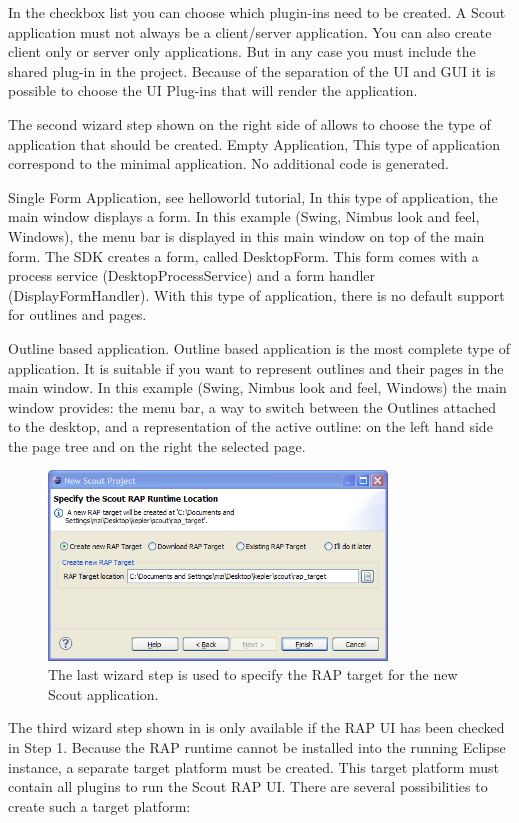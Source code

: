 \documentclass[a4paper,10pt,twoside]{book}
\begin{document}
In the checkbox list you can choose which plugin-ins need to be created. A Scout application must not always be a client/server application.
You can also create client only or server only applications. But in any case you must include the shared plug-in in the project.
Because of the separation of the UI and GUI it is possible to choose the UI Plug-ins that will render the application. 

The second wizard step shown on the right side of  allows to choose the type of application that should be created. 
Empty Application, This type of application correspond to the minimal application. No additional code is generated. 

Single Form Application, see helloworld tutorial, In this type of application, the main window displays a form. In this example (Swing, Nimbus look and feel, Windows), the menu bar is displayed in this main window on top of the main form.
The SDK creates a form, called DesktopForm. This form comes with a process service (DesktopProcessService) and a form handler (DisplayFormHandler).
With this type of application, there is no default support for outlines and pages. 

Outline based application. Outline based application is the most complete type of application. It is suitable if you want to represent outlines and their pages in the main window. 
In this example (Swing, Nimbus look and feel, Windows) the main window provides: the menu bar, a way to switch between the Outlines attached to the desktop, and a representation of the active outline: on the left hand side the page tree and on the right the selected page. 

\begin{figure}
\includegraphics[width=9cm]{wizard_new_project_3.png}
\caption{The last wizard step is used to specify the RAP target for the new Scout application.}
\end{figure}

The third wizard step shown in  is only available if the RAP UI has been checked in Step 1.
Because the RAP runtime cannot be installed into the running Eclipse instance, a separate target platform must be created. 
This target platform must contain all plugins to run the Scout RAP UI. 
There are several possibilities to create such a target platform:
\end{document}
